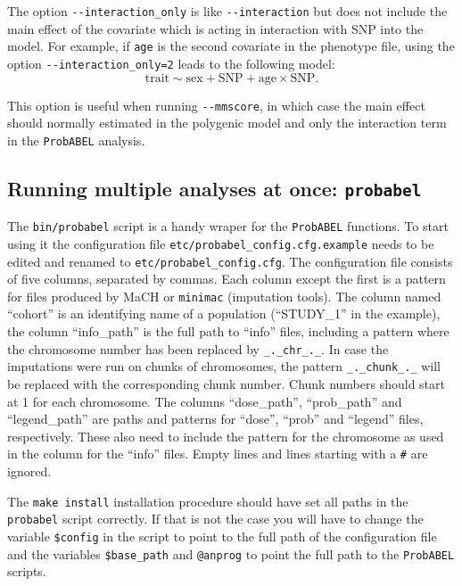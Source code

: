 \documentclass[12pt,a4paper]{article}
\newcommand{\PA}{\texttt{ProbABEL}}
\begin{document}
The option \lstinline{--interaction_only} is like \lstinline{--interaction}
but does not include the main effect of the covariate which is acting
in interaction with SNP into the model. For example, if \texttt{age}
is the second covariate in the phenotype file, using the option
\lstinline{--interaction_only=2} leads to the following model:
\begin{equation*}
  \textrm{trait} \sim \textrm{sex} + \textrm{SNP} +
  \textrm{age} \times \mathrm{SNP}.
\end{equation*}

This option is useful when
running \lstinline{--mmscore}, in which case the main effect should
normally estimated in the polygenic model and only the interaction
term in the \PA{} analysis.

\subsection{Running multiple analyses at once: \texttt{probabel}}
The \texttt{bin/probabel} script is a handy wraper for the \PA{}
functions. To start using it the configuration file
\texttt{etc/probabel\_config.cfg.example} needs to be edited and
renamed to \texttt{etc/probabel\_config.cfg}. The configuration file
consists of five columns, separated by commas. Each column except the
first is a pattern for files produced by MaCH or \texttt{minimac}
(imputation tools). The column named ``cohort'' is an identifying name
of a population (``STUDY\_1'' in the example), the column
``info\_path'' is the full path to ``info'' files, including a pattern
where the chromosome number has been replaced by
\texttt{\_.\_chr\_.\_}. In case the imputations were run on chunks of
chromosomes, the pattern \texttt{\_.\_chunk\_.\_} will be replaced
with the corresponding chunk number. Chunk numbers should start at 1
for each chromosome. The columns ``dose\_path'', ``prob\_path'' and
``legend\_path'' are paths and patterns for ``dose'', ``prob'' and
``legend'' files, respectively. These also need to include the pattern
for the chromosome as used in the column for the ``info'' files.
Empty lines and lines starting with a \texttt{\#} are ignored.

The \texttt{make install} installation procedure should have set all
paths in the \texttt{probabel} script correctly. If that is not the
case you will have to change the variable \texttt{\$config} in the
script to point to the full path of the configuration file and the
variables \texttt{\$base\_path} and \texttt{@anprog} to point the full
path to the \PA{} scripts.
\end{document}
